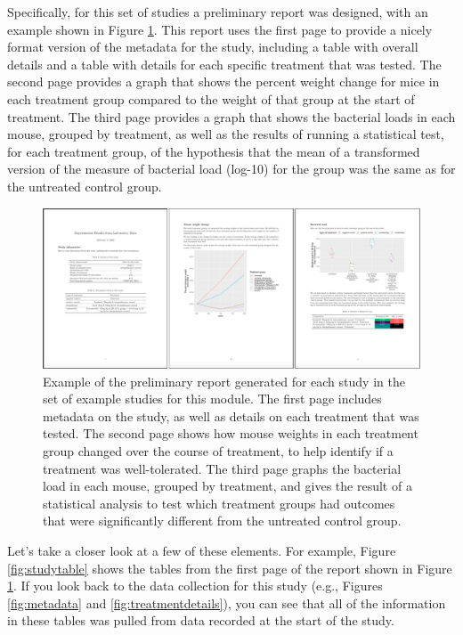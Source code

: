 \documentclass[]{tufte-book}
\begin{document}
Specifically, for this set of studies a preliminary report was designed, with an
example shown in Figure \ref{fig:prelimreport}. This report uses the first page
to provide a nicely format version of the metadata for the study, including a
table with overall details and a table with details for each specific treatment
that was tested. The second page provides a graph that shows the percent weight
change for mice in each treatment group compared to the weight of that group at
the start of treatment. The third page provides a graph that shows the bacterial
loads in each mouse, grouped by treatment, as well as the results of running a
statistical test, for each treatment group, of the hypothesis that the mean
of a transformed version of the measure of bacterial load (log-10) for the group
was the same as for the untreated control group.

\begin{figure}
\includegraphics[width=\textwidth]{figures/project_prelim_report} \caption[Example of the preliminary report generated for each study in the set of example studies for this module]{Example of the preliminary report generated for each study in the set of example studies for this module. The first page includes metadata on the study, as well as details on each treatment that was tested. The second page shows how mouse weights in each treatment group changed over the course of treatment, to help identify if a treatment was well-tolerated. The third page graphs the bacterial load in each mouse, grouped by treatment, and gives the result of a statistical analysis to test which treatment groups had outcomes that were significantly different from the untreated control group.}\label{fig:prelimreport}
\end{figure}

Let's take a closer look at a few of these elements. For example, Figure
\ref{fig:studytable} shows the tables from the first page of the report shown
in Figure \ref{fig:prelimreport}. If you look back to the data collection for
this study (e.g., Figures \ref{fig:metadata} and \ref{fig:treatmentdetails}),
you can see that all of the information in these tables was pulled from data
recorded at the start of the study.
\end{document}
